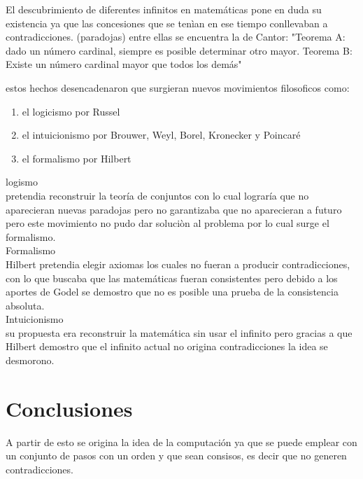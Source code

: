 \documentclass[11pt]{article}
\begin{document}
\begin{center}

El descubrimiento de diferentes infinitos en matemáticas pone en duda su existencia ya que las concesiones que se tenìan en ese tiempo conllevaban a contradicciones.
(paradojas) entre ellas se encuentra la de Cantor: 
"Teorema A: dado un número cardinal, siempre es posible determinar otro mayor.
Teorema B: Existe un número cardinal mayor que todos los demás"

estos hechos desencadenaron que surgieran nuevos movimientos filosoficos como:


\begin{enumerate}
    \item el logicismo por Russel
    \item el intuicionismo por Brouwer, Weyl, Borel, Kronecker y Poincaré
    \item el formalismo por Hilbert
\end{enumerate}

logismo\\
pretendia reconstruir la teoría de conjuntos con lo cual lograría que no aparecieran nuevas paradojas pero no garantizaba que no aparecieran a futuro pero este movimiento no pudo dar soluciòn al problema por lo cual surge el formalismo.\\

Formalismo\\
Hilbert pretendia elegir axiomas los cuales no fueran a producir contradicciones, con lo que buscaba que las matemáticas fueran consistentes pero debido a los aportes de Godel se demostro que no es posible una prueba de la consistencia absoluta.\\

Intuicionismo\\
su propuesta era reconstruir la matemática sin usar el infinito pero gracias a que Hilbert demostro que el infinito actual no origina contradicciones la idea se desmorono.\\

\cite{fernandez1988crisis}
\cite{hitt2013infinito}

\end{center}

\section{Conclusiones}

\begin{center}
A partir de esto se origina la idea de la computación ya que se puede emplear con un conjunto de pasos con un orden y que sean consisos, es decir que no generen contradicciones.
\end{center}


\medskip

 

\newpage
\end{document}
